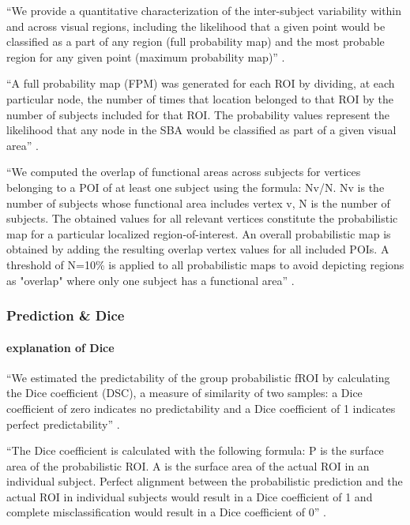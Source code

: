 ``We provide a quantitative characterization of the inter-subject variability
within and across visual regions, including the likelihood that a given point
would be classified as a part of any region (full probability map) and the most
probable region for any given point (maximum probability map)''
\citep{wang2015probabilistic}.


``A full probability map (FPM) was generated for each ROI by dividing, at each
particular node, the number of times that location belonged to that ROI by the
number of subjects included for that ROI.
%
The probability values represent the likelihood that any node in the SBA would
be classified as part of a given visual area'' \citep{wang2015probabilistic}.




``We computed the overlap of functional areas across subjects for vertices
belonging to a POI of at least one subject using the formula: Nv/N.
%
Nv is the number of subjects whose functional area includes vertex v,
%
N is the number of subjects.
%
The obtained values for all relevant vertices constitute the probabilistic map
for a particular localized region-of-interest.
%
An overall probabilistic map is obtained by adding the resulting overlap vertex
values for all included POIs.
%
A threshold of N=10\% is applied to all probabilistic maps to avoid depicting
regions as "overlap" where only one subject has a functional area''
\citep{frost2012measuring}.








\subsubsection{Prediction \& Dice}

\paragraph{explanation of Dice}

``We estimated the predictability of the group probabilistic fROI by calculating
the Dice coefficient (DSC), a measure of similarity of two samples:
%
a Dice coefficient of zero indicates no predictability and a Dice coefficient of
1 indicates perfect predictability'' \citep{rosenke2021probabilistic}.




``The Dice coefficient is calculated with the following formula:
%
P is the surface area of the probabilistic ROI.
%
A is the surface area of the actual ROI in an individual subject.
%
Perfect alignment between the probabilistic prediction and the actual ROI in
individual subjects would result in a Dice coefficient of 1 and complete
misclassification would result in a Dice coefficient of 0''
\citep{weiner2018defining}.


